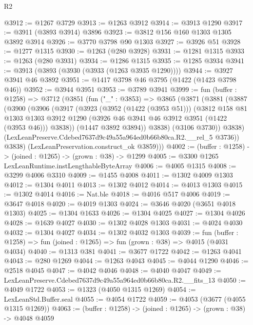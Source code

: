 \begin{lexlean}{R2}
\begin{coremodule}
@3912 := @1267 @3729
@3913 := @1263 @3912
@3914 := @3913 @1290
@3917 := @3911 (@3893 @3914) @3896
@3923 := @3812 @156 @160 @1303 @1305 @3892 @3914
@3926 := @3770 @3798 @90 @1303
@3927 := @3926 @51
@3928 := @1277 @1315
@3930 := @1263 (@280 @3928)
@3931 := @1281 @1315
@3933 := @1263 (@280 @3931)
@3934 := @1286 @1315
@3935 := @1285 @3934
@3941 := @3913 (@3893 (@3930 (@3933 (@1263 @3935 @1290))))
@3944 := @3927 @3941 @46 @3892
@3951 := @1417 @3798 @46 @3795 (@1422 (@1423 @3798 @46))
@3952 := @3944 @3951
@3953 := @3789 @3941
@3999 := fun (buffer : @1258) =>
  @3712
    (@3851
      (fun ("_" : @3853) =>
      @3865
        (@3871
          (@3881
            (@3887
              (@3900
                (@3906
                  (@3917
                    (@3923
                      (@3952 (@1422 (@3953 @51)))
                      (@3812
                        @158
                        @81
                        @1303
                        @1303
                        @3912
                        @1290
                        (@3926 @46 @3941 @46 @3912 @3951 (@1422 (@3953 @46)))
                        @3838))
                    (@1447 @3892 @3894))
                  @3838)
                (@3106 @3730))
              @3838)
            (LexLeanPreserve.Cdebed7637d9c49a55a964ed0b66b80ca.R2.__rel_5 @3736))
          @3838)
        (LexLeanPreservation.construct_ok @3859)))
@4002 := (buffer : @1258) -> (joined : @1265) -> (grown : @38) -> @1299
@4005 := @3300 @1265 LexLeanRuntime.instLengthableByteArray
@4006 := @4005 @1315
@4008 := @3299 @4006 @3310
@4009 := @1455 @4008
@4011 := @1302 @4009 @1303
@4012 := @1304 @4011
@4013 := @1302 @4012
@4014 := @4013 @1303
@4015 := @1302 @4014
@4016 := Nat.ble
@4018 := @4016 @517 @4006
@4019 := @3647 @4018
@4020 := @4019 @1303
@4024 := @3646 @4020 (@3651 @4018 @1303)
@4025 := @1304 @1633
@4026 := @1304 @4025
@4027 := @1304 @4026
@4028 := @1639 @4027
@4030 := @1302 @4028 @1303
@4031 := @4024 @4030
@4032 := @1304 @4027
@4034 := @1302 @4032 @1303
@4039 := fun (buffer : @1258) => fun (joined : @1265) => fun (grown : @38) => @4015 (@4031 @4034)
@4040 := @1313 @381
@4041 := @3677 @1722
@4042 := @1263 @4041
@4043 := @280 @1269
@4044 := @1263 @4043
@4045 := @4044 @1290
@4046 := @2518 @4045
@4047 := @4042 @4046
@4048 := @4040 @4047
@4049 := LexLeanPreserve.Cdebed7637d9c49a55a964ed0b66b80ca.R2.__fits_13
@4050 := @4049 @1722
@4053 := @1323 (@4050 @1315 @1269)
@4054 := LexLeanStd.Buffer.seal
@4055 := @4054 @1722
@4059 := @4053 (@3677 (@4055 @1315 @1269))
@4063 := (buffer : @1258) -> (joined : @1265) -> (grown : @38) -> @4048 @4059

\end{coremodule}
\end{lexlean}
